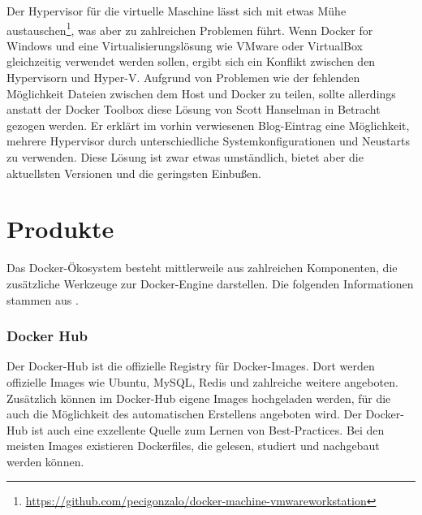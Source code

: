 Der Hypervisor für die virtuelle Maschine lässt sich mit etwas Mühe austauschen\footnote{\url{https://github.com/pecigonzalo/docker-machine-vmwareworkstation}}, was aber zu zahlreichen Problemen führt.
Wenn Docker for Windows und eine Virtualisierungslösung wie VMware oder VirtualBox gleichzeitig verwendet werden sollen, ergibt sich ein Konflikt zwischen den Hypervisorn und Hyper-V.
Aufgrund von Problemen wie der fehlenden Möglichkeit Dateien zwischen dem Host und Docker zu teilen, sollte allerdings anstatt der Docker Toolbox diese Lösung \autocite{hanselman-vms:online} von Scott Hanselman in Betracht gezogen werden.
Er erklärt im vorhin verwiesenen Blog-Eintrag eine Möglichkeit, mehrere Hypervisor durch unterschiedliche Systemkonfigurationen und Neustarts zu verwenden.
Diese Lösung ist zwar etwas umständlich, bietet aber die aktuellsten Versionen und die geringsten Einbußen.


\section{Produkte}
\label{sec:docker-products}
Das Docker-Ökosystem besteht mittlerweile aus zahlreichen Komponenten, die zusätzliche Werkzeuge zur Docker-Engine darstellen.
Die folgenden Informationen stammen aus \autocite{docker-engine:online}.
\subsubsection{Docker Hub}
\label{sec:docker-hub}
Der Docker-Hub ist die offizielle Registry für Docker-Images. Dort werden offizielle Images wie Ubuntu, MySQL, Redis und zahlreiche weitere angeboten.
Zusätzlich können im Docker-Hub eigene Images hochgeladen werden, für die auch die Möglichkeit des automatischen Erstellens angeboten wird.
Der Docker-Hub ist auch eine exzellente Quelle zum Lernen von Best-Practices.
Bei den meisten Images existieren Dockerfiles, die gelesen, studiert und nachgebaut werden können.
